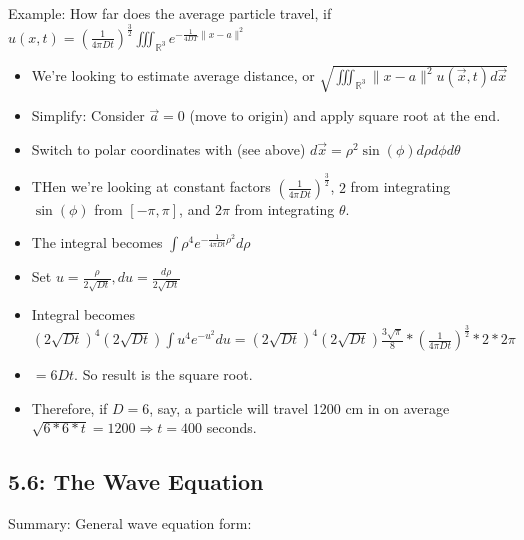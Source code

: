 \documentclass[11pt, oneside]{article}   	%
\begin{document}
Example: How far does the average particle travel, if $u(x,t) = (\frac{1}{4\pi D t})^{\frac{3}{2} }\iiint_{\mathbb{R}^3} e^{-\frac{1}{4DT} \|x-a\|^2}$ 
\begin{itemize}
\item We're looking to estimate average distance, or $\sqrt{\iiint_{\mathbb{R}^3} \|x - a\|^2 u(\vec{x},t) d\vec{x}}$
\item Simplify: Consider $\vec{a} = 0$ (move to origin) and apply square root at the end.
\item Switch to polar coordinates with (see above) $d\vec{x}=\rho^2 \sin(\phi) d\rho d\phi d\theta$
\item THen we're looking at constant factors $(\frac{1}{4\pi D t})^{\frac{3}{2}}$, $2$ from integrating $\sin(\phi)$ from $[-\pi, \pi]$, and $2\pi$ from integrating $\theta$.
\item The integral becomes $\int \rho^4 e^{-\frac{1}{4\pi D t} \rho^2} d\rho$
\item Set $u = \frac{\rho}{2\sqrt{Dt}}, du = \frac{d\rho}{2\sqrt{Dt}}$
\item Integral becomes $(2\sqrt{Dt})^4 (2\sqrt{Dt}) \int u^4e^{-u^2}du = (2\sqrt{Dt})^4 (2\sqrt{Dt}) \frac{3\sqrt{\pi}}{8} * (\frac{1}{4\pi D t})^{\frac{3}{2}} * 2 * 2\pi$
\item $=6Dt$. So result is the square root.
\item Therefore, if $D=6$, say, a particle will travel 1200 cm in on average $\sqrt{6*6*t} = 1200 \Rightarrow t = 400$  seconds.
\end{itemize}

\subsection{5.6: The Wave Equation}

Summary: General wave equation form:  
\end{document}
